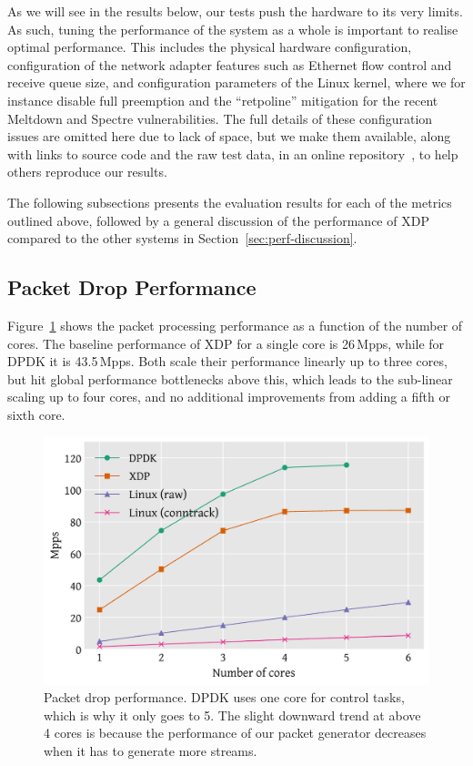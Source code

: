 \documentclass[10pt,sigconf]{acmart}
\begin{document}
As we will see in the results below, our tests push the hardware to its very
limits. As such, tuning the performance of the system as a whole is important to
realise optimal performance. This includes the physical hardware configuration,
configuration of the network adapter features such as Ethernet flow control and
receive queue size, and configuration parameters of the Linux kernel, where we
for instance disable full preemption and the ``retpoline'' mitigation for the
recent Meltdown and Spectre vulnerabilities. The full details of these
configuration issues are omitted here due to lack of space, but we make them
available, along with links to source code and the raw test data, in an online
repository~\cite{test-data}, to help others reproduce our results.

The following subsections presents the evaluation results for each of the
metrics outlined above, followed by a general discussion of the performance of
XDP compared to the other systems in Section~\ref{sec:perf-discussion}.

\subsection{Packet Drop Performance}
\label{sec:basel-pack-proc}
Figure~\ref{fig:drop-test} shows the packet processing performance as a function
of the number of cores. The baseline performance of XDP for a single core is
26\,Mpps, while for DPDK it is 43.5\,Mpps. Both scale their performance linearly
up to three cores, but hit global performance bottlenecks above this, which
leads to the sub-linear scaling up to four cores, and no additional improvements
from adding a fifth or sixth core.

\begin{figure}[t]
\centering
\includegraphics[width=\linewidth]{figures/drop-test.pdf}
\caption{\label{fig:drop-test} Packet drop performance. DPDK uses one core for
  control tasks, which is why it only goes to 5. The slight downward trend at
  above 4 cores is because the performance of our packet generator decreases
  when it has to generate more streams.}
\end{figure}
\end{document}
